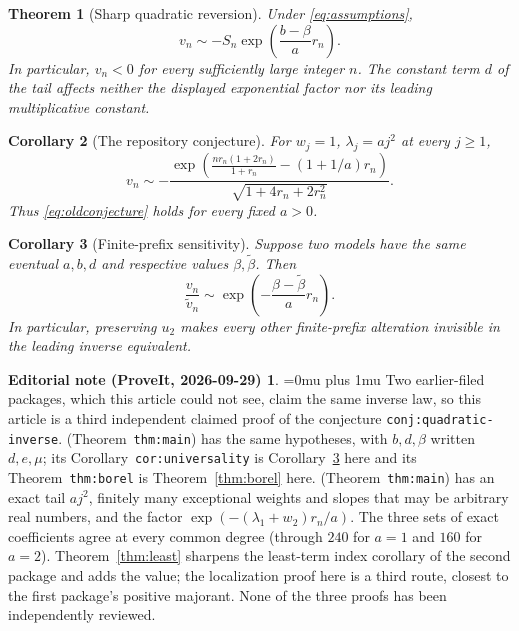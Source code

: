 \documentclass[11pt,a4paper]{article}
\numberwithin{equation}{section}
\newtheorem{theorem}{Theorem}[section]
\newtheorem{corollary}[theorem]{Corollary}
\theoremstyle{definition}\newtheorem{definition}[theorem]{Definition}
\theoremstyle{remark}\newtheorem{remark}[theorem]{Remark}
\theoremstyle{definition}
\newtheorem*{ednoteinner}{Editorial note (ProveIt, 2026-09-29)}
\newenvironment{ednote}{\begin{ednoteinner}\sloppy\Urlmuskip=0mu plus 1mu\relax}{\end{ednoteinner}}
\begin{document}
\begin{theorem}[Sharp quadratic reversion]
\label{thm:main}
Under \eqref{eq:assumptions},
\begin{equation}
 \boxed{\displaystyle
 v_n\sim-S_n\exp\!\left(\frac{b-\beta}{a}r_n\right).}
 \label{eq:main}
\end{equation}
In particular, \(v_n<0\) for every sufficiently large integer \(n\).
The constant term \(d\) of the tail affects neither the displayed exponential
factor nor its leading multiplicative constant.
\end{theorem}

\begin{corollary}[The repository conjecture]
\label{cor:pure}
For \(w_j=1\), \(\lambda_j=aj^2\) at every \(j\ge1\),
\[
 v_n\sim-\frac{\exp\!\left(
 \frac{nr_n(1+2r_n)}{1+r_n}-(1+1/a)r_n\right)}
 {\sqrt{1+4r_n+2r_n^2}}.
\]
Thus \eqref{eq:oldconjecture} holds for every fixed \(a>0\).
\end{corollary}

\begin{corollary}[Finite-prefix sensitivity]
\label{cor:prefix}
Suppose two models have the same eventual \(a,b,d\) and respective values
\(\beta,\widetilde\beta\). Then
\begin{equation}
 \frac{v_n}{\widetilde v_n}
 \sim\exp\!\left(-\frac{\beta-\widetilde\beta}{a}r_n\right).
 \label{eq:prefix}
\end{equation}
In particular, preserving \(u_2\) makes every other finite-prefix alteration
invisible in the leading inverse equivalent.
\end{corollary}

\begin{ednote}
Two earlier-filed packages, which this article could not see, claim the
same inverse law, so this article is a third independent claimed proof of
the conjecture \texttt{conj:quadratic-inverse}.
 \cite{ed:qfr}
(Theorem~\texttt{thm:main}) has the same hypotheses, with \(b,d,\beta\)
written \(d,e,\mu\); its Corollary~\texttt{cor:universality} is
Corollary~\ref{cor:prefix} here and its Theorem~\texttt{thm:borel} is
Theorem~\ref{thm:borel} here.
 \cite{ed:sqi}
(Theorem~\texttt{thm:main}) has an exact tail \(aj^2\), finitely many
exceptional weights and slopes that may be arbitrary real numbers, and the
factor
\(\exp(-(\lambda_1+w_2)r_n/a)\). The three sets of exact coefficients agree
at every common degree (through \(240\) for \(a=1\) and \(160\) for
\(a=2\)). Theorem~\ref{thm:least} sharpens the least-term index corollary of
the second package and adds the value; the localization proof here is a
third route, closest to the first package's positive majorant. None of the
three proofs has been independently reviewed.
\end{ednote}
\end{document}
